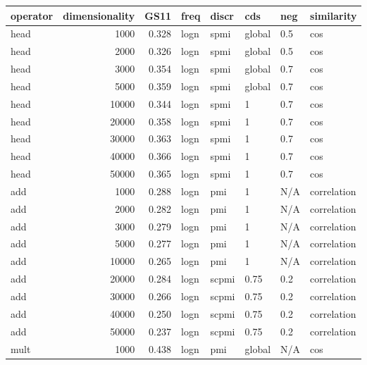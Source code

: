 \begin{tabular}{lrrlllll}
\toprule
operator &  dimensionality &   GS11 &  freq &  discr &     cds &  neg &     similarity \\
\midrule
    head &            1000 &  0.328 &  logn &   spmi &  global &  0.5 &            cos \\
    head &            2000 &  0.326 &  logn &   spmi &  global &  0.5 &            cos \\
    head &            3000 &  0.354 &  logn &   spmi &  global &  0.7 &            cos \\
    head &            5000 &  0.359 &  logn &   spmi &  global &  0.7 &            cos \\
    head &           10000 &  0.344 &  logn &   spmi &       1 &  0.7 &            cos \\
    head &           20000 &  0.358 &  logn &   spmi &       1 &  0.7 &            cos \\
    head &           30000 &  0.363 &  logn &   spmi &       1 &  0.7 &            cos \\
    head &           40000 &  0.366 &  logn &   spmi &       1 &  0.7 &            cos \\
    head &           50000 &  0.365 &  logn &   spmi &       1 &  0.7 &            cos \\
     add &            1000 &  0.288 &  logn &    pmi &       1 &  N/A &    correlation \\
     add &            2000 &  0.282 &  logn &    pmi &       1 &  N/A &    correlation \\
     add &            3000 &  0.279 &  logn &    pmi &       1 &  N/A &    correlation \\
     add &            5000 &  0.277 &  logn &    pmi &       1 &  N/A &    correlation \\
     add &           10000 &  0.265 &  logn &    pmi &       1 &  N/A &    correlation \\
     add &           20000 &  0.284 &  logn &  scpmi &    0.75 &  0.2 &    correlation \\
     add &           30000 &  0.266 &  logn &  scpmi &    0.75 &  0.2 &    correlation \\
     add &           40000 &  0.250 &  logn &  scpmi &    0.75 &  0.2 &    correlation \\
     add &           50000 &  0.237 &  logn &  scpmi &    0.75 &  0.2 &    correlation \\
    mult &            1000 &  0.438 &  logn &    pmi &  global &  N/A &            cos \\

\end{tabular}
